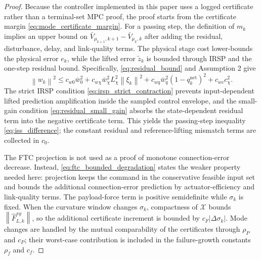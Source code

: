 \documentclass[twocolumn,3p,times,procedia]{elsarticle}
\newcommand{\norm}[1]{\left\lVert #1 \right\rVert}
\begin{document}
\begin{proof}
Because the controller implemented in this paper uses a logged certificate rather than a terminal-set MPC proof, the proof starts from the certificate margin \eqref{eq:mode_certificate_margin}. For a passing step, the definition of $m_k$ implies an upper bound on $\bar V_{\mu_{k+1},k+1}-\bar V_{\mu_k,k}$ after adding the residual, disturbance, delay, and link-quality terms. The physical stage cost lower-bounds the physical error $e_k$, while the lifted error $\tilde z_k$ is bounded through IRSP and the one-step residual bound. Specifically, \eqref{eq:residual_bound} and Assumption 2 give
\begin{equation}
\norm{w_k}^2
\le c_{w0}\bar w_0^2+c_{w\chi}\bar w_\chi^2L_\chi^2\norm{\xi_k}^2
+c_{wq}\bar w_q^2(1-q_k^{\mathrm{net}})^2+c_{wc}c_\chi^2 .
\label{eq:residual_absorption}
\end{equation}
The strict IRSP condition \eqref{eq:irsp_strict_contraction} prevents input-dependent lifted prediction amplification inside the sampled control envelope, and the small-gain condition \eqref{eq:residual_small_gain} absorbs the state-dependent residual term into the negative certificate term. This yields the passing-step inequality \eqref{eq:iss_difference}; the constant residual and reference-lifting mismatch terms are collected in $c_0$.

The FTC projection is not used as a proof of monotone connection-error decrease. Instead, \eqref{eq:ftc_bounded_degradation} states the weaker property needed here: projection keeps the command in the conservative feasible input set and bounds the additional connection-error prediction by actuator-efficiency and link-quality terms. The payload-force term is positive semidefinite while $\sigma_k$ is fixed. When the curvature window changes $\sigma_k$, compactness of $\mathcal X$ bounds $\norm{\hat F_{L,k}^{xy}}$, so the additional certificate increment is bounded by $c_F|\Delta\sigma_k|$. Mode changes are handled by the mutual comparability of the certificates through $\rho_P$ and $c_P$; their worst-case contribution is included in the failure-growth constants $\rho_f$ and $c_f$.


\end{proof}
\end{document}
